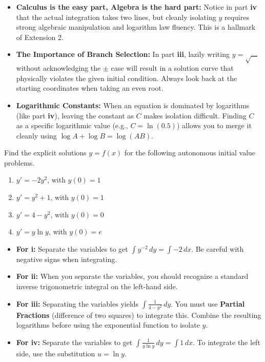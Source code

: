 \begin{takeaways}
\begin{itemize}[leftmargin=*]
    \item \textbf{Calculus is the easy part, Algebra is the hard part:} Notice in part \textbf{iv} that the actual integration takes two lines, but cleanly isolating $y$ requires strong algebraic manipulation and logarithm law fluency. This is a hallmark of Extension 2.
    \item \textbf{The Importance of Branch Selection:} In part \textbf{iii}, lazily writing $y = \sqrt{\dots}$ without acknowledging the $\pm$ case will result in a solution curve that physically violates the given initial condition. Always look back at the starting coordinates when taking an even root.
    \item \textbf{Logarithmic Constants:} When an equation is dominated by logarithms (like part \textbf{iv}), leaving the constant as $C$ makes isolation difficult. Finding $C$ as a specific logarithmic value (e.g., $C = \ln(0.5)$) allows you to merge it cleanly using $\log A + \log B = \log(AB)$.
\end{itemize}
\end{takeaways}

\begin{problem}
Find the explicit solutions $y = f(x)$ for the following autonomous initial value problems. 

\begin{enumerate}
    \item[\textbf{i}] $y' = -2y^2$, with $y(0) = 1$
    \item[\textbf{ii}] $y' = y^2 + 1$, with $y(0) = 1$
    \item[\textbf{iii}] $y' = 4 - y^2$, with $y(0) = 0$
    \item[\textbf{iv}] $y' = y \ln y$, with $y(0) = e$
\end{enumerate}
\end{problem}

\begin{hint}
\begin{itemize}
    \item \textbf{For i:} Separate the variables to get $\int y^{-2} \, dy = \int -2 \, dx$. Be careful with negative signs when integrating.
    \item \textbf{For ii:} When you separate the variables, you should recognize a standard inverse trigonometric integral on the left-hand side.
    \item \textbf{For iii:} Separating the variables yields $\int \frac{1}{4 - y^2} \, dy$. You must use \textbf{Partial Fractions} (difference of two squares) to integrate this. Combine the resulting logarithms before using the exponential function to isolate $y$.
    \item \textbf{For iv:} Separate the variables to get $\int \frac{1}{y \ln y} \, dy = \int 1 \, dx$. To integrate the left side, use the substitution $u = \ln y$. 
\end{itemize}
\end{hint}

